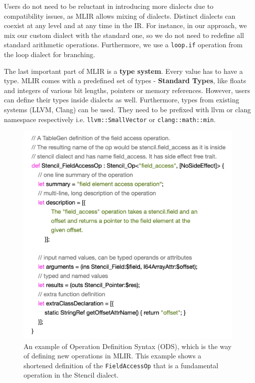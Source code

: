\documentclass[sigplan,\review anonymous]{acmart}
\begin{document}
Users do not need to be reluctant in introducing more dialects due to
compatibility issues, as MLIR allows mixing of dialects. Distinct dialects can
coexist at any level and at any time in the IR. For instance, in our approach,
we mix our custom dialect with the standard one, so we do not need to redefine
all standard arithmetic operations. Furthermore, we use a \texttt{loop.if}
operation from the loop dialect for branching.

The last important part of MLIR is a \textbf{type system}. Every value has to
have a type. MLIR comes with a predefined set of types -
\textbf{Standard Types}, like floats and integers of various bit lengths,
pointers or memory references. However, users can define their types inside
dialects as well. Furthermore, types from existing systems (LLVM, Clang) can
be used. They need to be prefixed with llvm or clang namespace respectively
i.e. \texttt{llvm::SmallVector} or \texttt{clang::math::min}.

\begin{figure}
  \centering
  \includegraphics[width=\columnwidth]{images/op_definition.png}
  \caption{An example of Operation Definition Syntax (ODS), which is the 
  way of defining new operations in MLIR. This example shows a shortened
  definition of the \texttt{FieldAccessOp} that is a fundamental operation
  in the Stencil dialect.}
  \label{fig:op_definition}
\end{figure}
\end{document}

